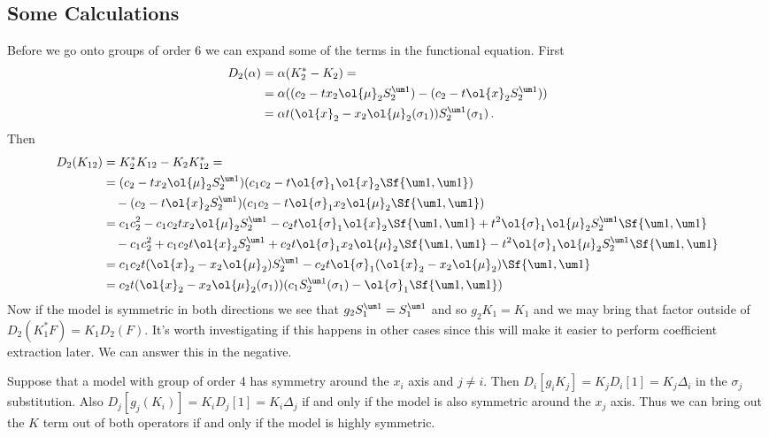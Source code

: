 \subsection{Some Calculations}
Before we go onto groups of order 6 we can expand some of the terms in the functional equation. First
\begin{align}
\begin{split}
	D_2(\alpha) &= \alpha(K_2^\ast -K_2) = \\
			&= \alpha((c_2- tx_2\ol{\mu}_2 S_2^{\um 1})-(c_2- t\ol{x}_2 S_2^{\um 1}))\\
			&= \alpha t(\ol{x}_2 - x_2\ol{\mu}_2(\sigma_1))S_2^{\um 1}(\sigma_1)\,.
\end{split}
\end{align}
Then
\begin{align}
\begin{split}
	D_2(K_{12}) &=K_2^\ast K_{12}- K_2 K_{12}^\ast = \\
			&=(c_2- tx_2\ol{\mu}_2 S_2^{\um 1})(c_1c_2-t\ol{\sigma}_1\ol{x}_2\Sf{\um 1,\um 1}) \\
			&\quad-(c_2- t\ol{x}_2 S_2^{\um 1})(c_1c_2-t\ol{\sigma}_1x_2\ol{\mu}_2\Sf{\um 1,\um 1})\\
			&=c_1c_2^2-c_1c_2tx_2\ol{\mu}_2S_2^{\um 1} - c_2t\ol{\sigma}_1\ol{x}_2\Sf{\um 1,\um 1}+ t^2\ol{\sigma}_1\ol{\mu}_2S_2^{\um 1}\Sf{\um 1,\um 1}\\
			&\quad - c_1c_2^2+c_1c_2t\ol{x}_2S_2^{\um 1} + c_2t\ol{\sigma}_1x_2 \ol{\mu}_2\Sf{\um 1,\um 1}-  t^2\ol{\sigma}_1\ol{\mu}_2S_2^{\um 1}\Sf{\um 1,\um 1}\\
			&=c_1c_2t(\ol{x}_2-x_2\ol{\mu}_2)S_2^{\um 1} - c_2t\ol{\sigma}_1(\ol{x}_2-x_2\ol{\mu}_2)\Sf{\um 1,\um 1}\\
			&=c_2t(\ol{x}_2-x_2\ol{\mu}_2(\sigma_1))(c_1S_2^{\um 1}(\sigma_1) - \ol{\sigma}_1\Sf{\um 1,\um 1})\\
\end{split}
\end{align}
Now if the model is symmetric in both directions we see that $g_2 S_1^{\um 1} = S_1^{\um 1}$ and so $g_2 K_1 = K_1$ and we may bring that factor outside of $D_2(K_1^\ast F) = K_1 D_2(F)$. It's worth investigating if this happens in other cases since this will make it easier to perform coefficient extraction later. We can answer this in the negative.
\begin{prop} Suppose that a model with group of order 4 has symmetry around the $x_i$ axis and $j\neq i$. Then $D_i[g_iK_j] = K_jD_i[1] = K_j \Delta_i$ in the $\sigma_j$ substitution. Also $D_j[g_j(K_i)] = K_i D_j[1] = K_i \Delta_j$ if and only if the model is also symmetric around the $x_j$ axis. Thus we can bring out the $K$ term out of both operators if and only if the model is highly symmetric.
\end{prop}
